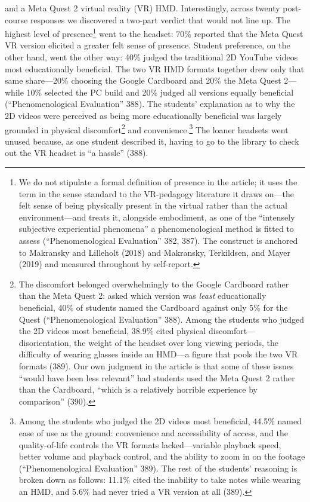 and a Meta Quest 2 virtual reality (VR) HMD. Interestingly, across twenty
post-course responses we discovered a two-part verdict that would not line up.
The highest level of presence\footnote{We do not stipulate a formal definition
of presence in the article; it uses the term in the sense standard to the
VR-pedagogy literature it draws on---the felt sense of being physically present
in the virtual rather than the actual environment---and treats it, alongside
embodiment, as one of the ``intensely subjective experiential phenomena'' a
phenomenological method is fitted to assess (``Phenomenological Evaluation''
382, 387). The construct is anchored to Makransky and Lilleholt (2018) and
Makransky, Terkildsen, and Mayer (2019) and measured throughout by
self-report.} went to the headset: 70\% reported that the Meta Quest
VR version elicited a greater felt sense of presence. Student preference, on the
other hand, went the other way: 40\% judged the traditional 2D YouTube
videos most educationally beneficial. The two VR HMD formats together drew only
that same share---20\% choosing the Google Cardboard and 20\% the Meta Quest
2---while 10\% selected the PC build and 20\% judged all versions equally
beneficial (``Phenomenological Evaluation''
388). The students' explanation as to why the 2D videos were perceived as being
more educationally beneficial was largely grounded in physical
discomfort\footnote{The discomfort belonged overwhelmingly to the Google
Cardboard rather than the Meta Quest 2: asked which version was \textit{least}
educationally beneficial, 40\% of students named the Cardboard against only 5\%
for the Quest (``Phenomenological Evaluation'' 388). Among the students who
judged the 2D videos most beneficial, 38.9\% cited physical
discomfort---disorientation, the weight of the headset over long viewing
periods, the difficulty of wearing glasses inside an HMD---a figure that pools
the two VR formats (389). Our own judgment in the article is that some of these
issues ``would have been less relevant'' had students used the Meta Quest 2
rather than the Cardboard, ``which is a relatively horrible experience by
comparison'' (390).} and convenience.\footnote{Among the students who judged the
2D videos most beneficial, 44.5\% named ease of use as the ground: convenience
and accessibility of access, and the quality-of-life controls the VR formats
lacked---variable playback speed, better volume and playback control, and the
ability to zoom in on the footage (``Phenomenological Evaluation'' 389). The
rest of the students' reasoning is broken down as follows: 11.1\% cited the
inability to take notes while wearing an HMD, and 5.6\% had never tried a VR
version at all (389).} The loaner headsets went unused because, as one student
described it, having to go to the library to check out the VR headset is ``a
hassle'' (388).

